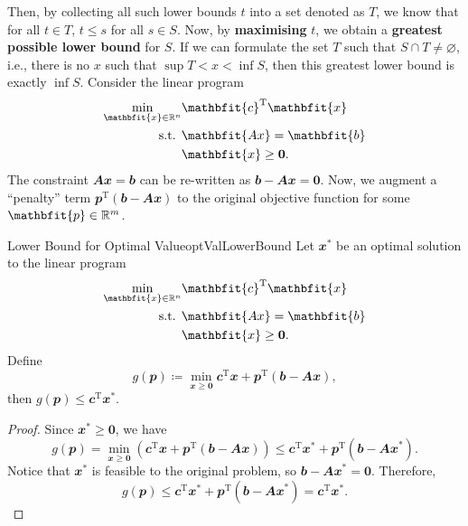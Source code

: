 \documentclass[math, code]{amznotes}
\theoremstyle{remark}
\begin{document}
Then, by collecting all such lower bounds $t$ into a set denoted as $T$, we know that for all $t \in T$, $t \leq s$ for all $s \in S$. Now, by \textbf{maximising} $t$, we obtain a \textbf{greatest possible lower bound} for $S$. If we can formulate the set $T$ such that $S \cap T \neq \varnothing$, i.e., there is no $x$ such that $\sup T < x < \inf S$, then this greatest lower bound is exactly $\inf S$.
Consider the linear program
\begin{align*}
    \min_{\mathbfit{x} \in \R^n} & \mathbfit{c}^{\mathrm{T}}\mathbfit{x} \\
    \textrm{s.t. } & \mathbfit{Ax} = \mathbfit{b} \\
    & \mathbfit{x} \geq \mathbf{0}.
\end{align*}
The constraint $\mathbfit{Ax} = \mathbfit{b}$ can be re-written as $\mathbfit{b - Ax} = \mathbf{0}$. Now, we augment a ``penalty'' term $\mathbfit{p}^{\mathrm{T}}(\mathbfit{b - Ax})$ to the original objective function for some $\mathbfit{p} \in \R^m$.
\begin{probox}{Lower Bound for Optimal Value}{optValLowerBound}
    Let $\mathbfit{x}^*$ be an optimal solution to the linear program
    \begin{align*}
        \min_{\mathbfit{x} \in \R^n} & \mathbfit{c}^{\mathrm{T}}\mathbfit{x} \\
        \textrm{s.t. } & \mathbfit{Ax} = \mathbfit{b} \\
        & \mathbfit{x} \geq \mathbf{0}.
    \end{align*}
    Define 
    \begin{equation*}
        g(\mathbfit{p}) \coloneqq \min_{\mathbfit{x} \geq \mathbf{0}}\mathbfit{c}^{\mathrm{T}}\mathbfit{x} + \mathbfit{p}^{\mathrm{T}}(\mathbfit{b - Ax}),
    \end{equation*}
    then $g(\mathbfit{p}) \leq \mathbfit{c}^{\mathrm{T}}\mathbfit{x}^*$.
    \tcblower
    \begin{proof}
        Since $\mathbfit{x}^* \geq \mathbf{0}$, we have 
        \begin{equation*}
            g(\mathbfit{p}) = \min_{\mathbfit{x} \geq \mathbf{0}}\left(\mathbfit{c}^{\mathrm{T}}\mathbfit{x} + \mathbfit{p}^{\mathrm{T}}(\mathbfit{b - Ax})\right) \leq \mathbfit{c}^{\mathrm{T}}\mathbfit{x}^* + \mathbfit{p}^{\mathrm{T}}(\mathbfit{b - Ax}^*).
        \end{equation*}
        Notice that $\mathbfit{x}^*$ is feasible to the original problem, so $\mathbfit{b - Ax}^* = \mathbf{0}$. Therefore, 
        \begin{equation*}
            g(\mathbfit{p}) \leq \mathbfit{c}^{\mathrm{T}}\mathbfit{x}^* + \mathbfit{p}^{\mathrm{T}}(\mathbfit{b - Ax}^*) = \mathbfit{c}^{\mathrm{T}}\mathbfit{x}^*.
        \end{equation*}
    \end{proof}
\end{probox}
\end{document}
